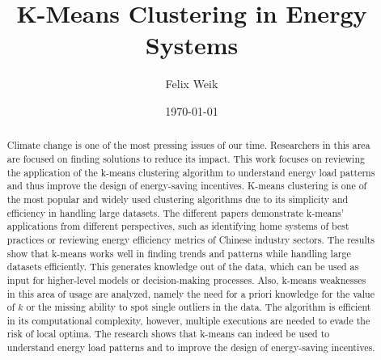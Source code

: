 \documentclass{revtex4-2}
\begin{document}
\title{K-Means Clustering in Energy Systems}
\author{Felix Weik}
\date{\today}


\begin{abstract}
Climate change is one of the most pressing issues of our time. 
Researchers in this area are focused on finding solutions to reduce its impact.
This work focuses on reviewing the application of the k-means clustering algorithm to understand energy load patterns and thus improve the design of energy-saving incentives.
K-means clustering is one of the most popular and widely used clustering algorithms due to its simplicity and efficiency in handling large datasets.
The different papers demonstrate k-means' applications from different perspectives, such as identifying home systems of best practices or reviewing energy efficiency metrics of Chinese industry sectors.
The results show that k-means works well in finding trends and patterns while handling large datasets efficiently.
This generates knowledge out of the data, which can be used as input for higher-level models or decision-making processes.
Also, k-means weaknesses in this area of usage are analyzed, namely the need for a priori knowledge for the value of $k$ or the missing ability to spot single outliers in the data.
The algorithm is efficient in its computational complexity, however, multiple executions are needed to evade the risk of local optima.
The research shows that k-means can indeed be used to understand energy load patterns and to improve the design of energy-saving incentives.
\end{abstract}

\maketitle













\end{document}
